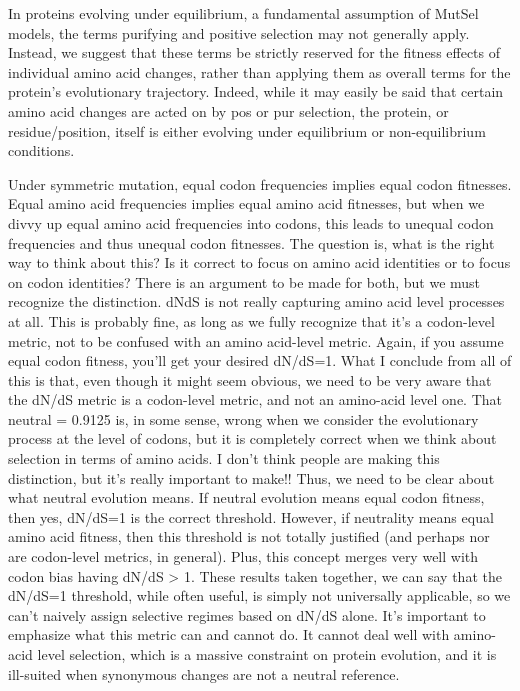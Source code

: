 \documentclass[11pt]{article}
\begin{document}
In proteins evolving under equilibrium, a fundamental assumption of MutSel models, the terms purifying and positive selection may not generally apply. Instead, we suggest that these terms be strictly reserved for the fitness effects of individual amino acid changes, rather than applying them as overall terms for the protein's evolutionary trajectory. Indeed, while it may easily be said that certain amino acid changes are acted on by pos or pur selection, the protein, or residue/position, itself is either evolving under equilibrium or non-equilibrium conditions. 


Under symmetric mutation, equal codon frequencies implies equal codon fitnesses. Equal amino acid frequencies implies equal amino acid fitnesses, but when we divvy up equal amino acid frequencies into codons, this leads to unequal codon frequencies and thus unequal codon fitnesses. The question is, what is the right way to think about this? Is it correct to focus on amino acid identities or to focus on codon identities? There is an argument to be made for both, but we must recognize the distinction. dNdS is not really capturing amino acid level processes at all. This is probably fine, as long as we fully recognize that it's a codon-level metric, not to be confused with an amino acid-level metric. Again, if you assume equal codon fitness, you'll get your desired dN/dS=1. What I conclude from all of this is that, even though it might seem obvious, we need to be very aware that the dN/dS metric is a codon-level metric, and not an amino-acid level one. That neutral = 0.9125 is, in some sense, wrong when we consider the evolutionary process at the level of codons, but it is completely correct when we think about selection in terms of amino acids. I don't think people are making this distinction, but it's really important to make!! Thus, we need to be clear about what neutral evolution means. If neutral evolution means equal codon fitness, then yes, dN/dS=1 is the correct threshold. However, if neutrality means equal amino acid fitness, then this threshold is not totally justified (and perhaps nor are codon-level metrics, in general). Plus, this concept merges very well with codon bias having dN/dS > 1. These results taken together, we can say that the dN/dS=1 threshold, while often useful, is simply not universally applicable, so we can't naively assign selective regimes based on dN/dS alone. It's important to emphasize what this metric can and cannot do. It cannot deal well with amino-acid level selection, which is a massive constraint on protein evolution, and it is ill-suited when synonymous changes are not a neutral reference.
\end{document}
